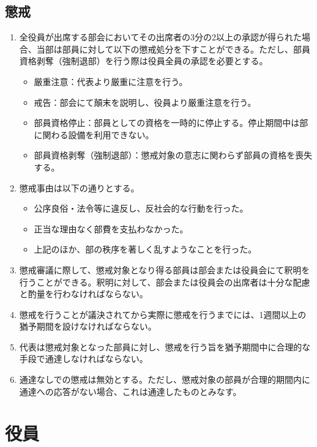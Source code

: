 \documentclass[12pt, unicode, a4paper]{ltjsreport}
\begin{document}
    \section{懲戒}\label{disciplinary}
        \begin{enumerate}
            \item 全役員が出席する部会においてその出席者の3分の2以上の承認が得られた場合、当部は部員に対して以下の懲戒処分を下すことができる。ただし、部員資格剥奪（強制退部）を行う際は役員全員の承認を必要とする。
            \begin{itemize}
                \item 厳重注意：代表より厳重に注意を行う。
                \item 戒告：部会にて顛末を説明し、役員より厳重注意を行う。
                \item 部員資格停止：部員としての資格を一時的に停止する。停止期間中は部に関わる設備を利用できない。
                \item 部員資格剥奪（強制退部）：懲戒対象の意志に関わらず部員の資格を喪失する。
            \end{itemize}
            \item 懲戒事由は以下の通りとする。
            \begin{itemize}
                \item 公序良俗・法令等に違反し、反社会的な行動を行った。
                \item 正当な理由なく部費を支払わなかった。
                \item 上記のほか、部の秩序を著しく乱すようなことを行った。
            \end{itemize}
            \item 懲戒審議に際して、懲戒対象となり得る部員は部会または役員会にて釈明を行うことができる。釈明に対して、部会または役員会の出席者は十分な配慮と酌量を行わなければならない。
            \item 懲戒を行うことが議決されてから実際に懲戒を行うまでには、1週間以上の猶予期間を設けなければならない。
            \item 代表は懲戒対象となった部員に対し、懲戒を行う旨を猶予期間中に合理的な手段で通達しなければならない。
            \item 通達なしでの懲戒は無効とする。ただし、懲戒対象の部員が合理的期間内に通達への応答がない場合、これは通達したものとみなす。
        \end{enumerate}


\chapter{役員}
\end{document}
